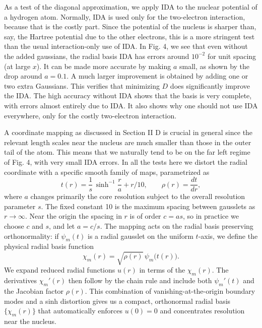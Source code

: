 \documentclass[aps,pra,reprint,longbibliography,nofootinbib]{revtex4-2}
\begin{document}
As a test of the diagonal approximation, we apply IDA to the nuclear potential of a hydrogen atom. Normally, IDA is used only for the two-electron interaction, because that is the costly part. Since the potential of the nucleus is sharper than, say, the Hartree potential due to the other electrons, this is a more stringent test than the usual interaction-only use of IDA. In Fig. 4, we see that even without the added gaussians, the radial basis IDA has errors around $10^{-2}$ for unit spacing (at large $x$).  It can be made more accurate by making $a$ small, as shown by the drop around $a=0.1$. A much larger improvement is obtained by adding one or two extra Gaussians.  This verifies that minimizing $D$ does significantly improve the IDA. The high accuracy without IDA shows that the basis is very complete, with errors almost entirely due to IDA. It also shows why one should not use IDA everywhere, only for the costly two-electron interaction.

A coordinate mapping as discussed in Section II D is crucial in general since the relevant length scales near the nucleus are much smaller than those in the outer tail of the atom. This means that we naturally tend to be on the far left regime of Fig. 4, with very small IDA errors. In all the tests here we distort the radial coordinate with a specific smooth family of maps, parametrized as
\begin{equation}
t(r) = \frac{1}{s}\,\sinh^{-1}\!\frac{r}{a} + r/10,
\qquad
\rho(r) = \frac{dt}{dr},
\end{equation}
where $a$ changes primarily the core resolution subject to the overall resolution parameter $s$.  The fixed constant 10 is the maximum spacing between gausslets as $r\to \infty$. Near the origin the spacing in $r$ is of order $c=a s$, so in practice we choose $c$ and $s$, and let $a=c/s$. The mapping acts on the radial basis preserving orthonormality: if $\psi_m(t)$ is a radial gausslet on the uniform $t$-axis, we define the physical radial basis function
\begin{equation}
\chi_m(r) = \sqrt{\rho(r)}\,\psi_m\!\big(t(r)\big).
\end{equation}
We expand reduced radial functions $u(r)$ in terms of the $\chi_m(r)$. The derivatives $\chi_m'(r)$ then follow by the chain rule and include both $\psi_m'(t)$ and the Jacobian factor $\rho(r)$. This combination of vanishing-at-the-origin boundary modes and a sinh distortion gives us a compact, orthonormal radial basis $\{\chi_m(r)\}$ that automatically enforces $u(0)=0$ and concentrates resolution near the nucleus.
\end{document}
